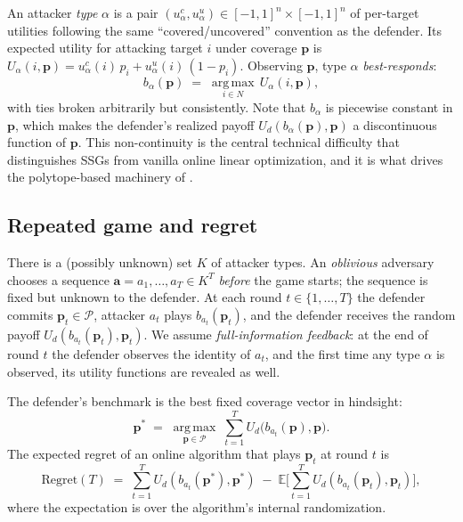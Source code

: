 \documentclass[letterpaper,9pt,twocolumn]{extarticle}
\newcommand{\pvec}{\mathbf{p}}
\newcommand{\avec}{\mathbf{a}}
\newcommand{\cP}{\mathcal{P}}
\newcommand{\EE}{\mathbb{E}}
\newcommand{\argmax}{\operatorname*{arg\,max}}
\newcommand{\Regret}{\mathrm{Regret}}
\theoremstyle{plain}
\theoremstyle{definition}
\theoremstyle{remark}
\begin{document}
An attacker \emph{type} $\alpha$ is a pair
$(u_\alpha^c,u_\alpha^u)\in[-1,1]^n\times[-1,1]^n$ of per-target utilities
following the same ``covered/uncovered'' convention as the defender. Its
expected utility for attacking target $i$ under coverage $\pvec$ is
$
U_\alpha(i,\pvec)=u_\alpha^c(i)\,p_i + u_\alpha^u(i)\,(1-p_i).
$
Observing $\pvec$, type $\alpha$ \emph{best-responds}:
\begin{equation}
b_\alpha(\pvec)\;=\;\argmax_{i\in N}\,U_\alpha(i,\pvec),
\label{eq:br}
\end{equation}
with ties broken arbitrarily but consistently. Note that $b_\alpha$ is
piecewise constant in $\pvec$, which makes the defender's realized payoff
$U_d(b_\alpha(\pvec),\pvec)$ a discontinuous function of $\pvec$. This
non-continuity is the central technical difficulty that distinguishes SSGs
from vanilla online linear optimization, and it is what drives the
polytope-based machinery of \citet{balcan2015}.

\subsection{Repeated game and regret}

There is a (possibly unknown) set $K$ of attacker types. An
\emph{oblivious} adversary chooses a sequence
$\avec=a_1,\dots,a_T\in K^T$ \emph{before} the game starts; the sequence
is fixed but unknown to the defender. At each round
$t\in\{1,\dots,T\}$ the defender commits $\pvec_t\in\cP$, attacker
$a_t$ plays $b_{a_t}(\pvec_t)$, and the defender receives the random
payoff $U_d(b_{a_t}(\pvec_t),\pvec_t)$. We assume \emph{full-information
feedback}: at the end of round $t$ the defender observes the identity of
$a_t$, and the first time any type $\alpha$ is observed, its utility
functions are revealed as well.

The defender's benchmark is the best fixed coverage vector in hindsight:
\begin{equation}
\pvec^{*}\;=\;\argmax_{\pvec\in\cP}\;\sum_{t=1}^T U_d\bigl(b_{a_t}(\pvec),\pvec\bigr).
\label{eq:pstar}
\end{equation}
The expected regret of an online algorithm that plays $\pvec_t$ at round
$t$ is
\begin{equation}
\Regret(T)\;=\;\sum_{t=1}^T\!U_d(b_{a_t}(\pvec^{*}),\pvec^{*})\;-\;\EE\!\bigg[\sum_{t=1}^T\!U_d(b_{a_t}(\pvec_t),\pvec_t)\bigg],
\label{eq:regret}
\end{equation}
where the expectation is over the algorithm's internal randomization.
\end{document}
